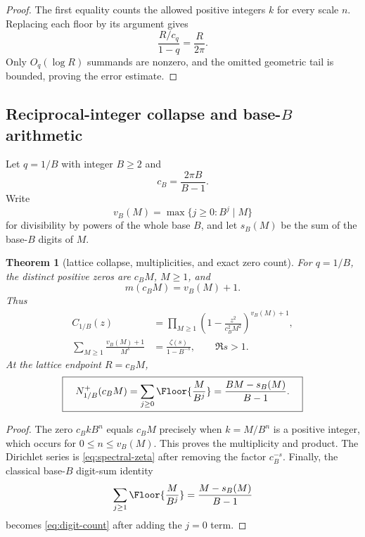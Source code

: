 \documentclass[11pt,oneside]{article}
\newtheorem{theorem}{Theorem}[section]
\theoremstyle{definition}
\theoremstyle{remark}
\begin{document}
\begin{proof}
The first equality counts the allowed positive integers $k$ for every scale $n$.  Replacing each floor by its argument gives
\[
 \frac{R/c_q}{1-q}=\frac{R}{2\pi}.
\]
Only $O_q(\log R)$ summands are nonzero, and the omitted geometric tail is bounded, proving the error estimate.
\end{proof}

\subsection{Reciprocal-integer collapse and base-$B$ arithmetic}

Let $q=1/B$ with integer $B\ge2$ and
\begin{equation}\label{eq:cB}
 c_B=\frac{2\pi B}{B-1}.
\end{equation}
Write
\[
 v_B(M)=\max\{j\ge0:B^j\mid M\}
\]
for divisibility by powers of the whole base $B$, and let $s_B(M)$ be the sum of the base-$B$ digits of $M$.

\begin{theorem}[lattice collapse, multiplicities, and exact zero count]\label{thm:digit-zero-count}
For $q=1/B$, the distinct positive zeros are $c_BM$, $M\ge1$, and
\begin{equation}\label{eq:multiplicity-B}
 m(c_BM)=v_B(M)+1.
\end{equation}
Thus
\begin{align}
 C_{1/B}(z)&=\prod_{M\ge1}
 \left(1-\frac{z^2}{c_B^2M^2}\right)^{v_B(M)+1},\label{eq:digit-hadamard}\\
 \sum_{M\ge1}\frac{v_B(M)+1}{M^s}
 &=\frac{\zeta(s)}{1-B^{-s}},\qquad \Re s>1.
 \label{eq:valuation-dirichlet}
\end{align}
At the lattice endpoint $R=c_BM$,
\begin{equation}\label{eq:digit-count}
 \boxed{\quad
 N_{1/B}^+(c_BM)
 =\sum_{j\ge0}\Floor{\frac{M}{B^j}}
 =\frac{BM-s_B(M)}{B-1}.
 \quad}
\end{equation}
\end{theorem}

\begin{proof}
The zero $c_BkB^n$ equals $c_BM$ precisely when $k=M/B^n$ is a positive integer, which occurs for $0\le n\le v_B(M)$.  This proves the multiplicity and product.  The Dirichlet series is \cref{eq:spectral-zeta} after removing the factor $c_B^{-s}$.  Finally, the classical base-$B$ digit-sum identity
\[
 \sum_{j\ge1}\Floor{\frac{M}{B^j}}
 =\frac{M-s_B(M)}{B-1}
\]
becomes \cref{eq:digit-count} after adding the $j=0$ term.
\end{proof}
\end{document}
